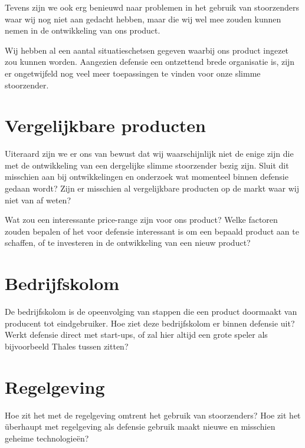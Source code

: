 \documentclass[oneside, a4paper, openany]{memoir}
\begin{document}
Tevens zijn we ook erg benieuwd naar problemen in het gebruik van stoorzenders waar wij nog niet aan gedacht hebben, maar die wij wel mee zouden kunnen nemen in de ontwikkeling van ons product.

Wij hebben al een aantal situatieschetsen gegeven waarbij ons product ingezet zou kunnen worden. Aangezien defensie een ontzettend brede organisatie is, zijn er ongetwijfeld nog veel meer toepassingen te vinden voor onze slimme stoorzender.

\section{Vergelijkbare producten}
Uiteraard zijn we er ons van bewust dat wij waarschijnlijk niet de enige zijn die met de ontwikkeling van een dergelijke slimme stoorzender bezig zijn. Sluit dit misschien aan bij ontwikkelingen en onderzoek wat momenteel binnen defensie gedaan wordt? Zijn er misschien al vergelijkbare producten op de markt waar wij niet van af weten?

Wat zou een interessante price-range zijn voor ons product? Welke factoren zouden bepalen of het voor defensie interessant is om een bepaald product aan te schaffen, of te investeren in de ontwikkeling van een nieuw product?

\section{Bedrijfskolom}
De bedrijfskolom is de opeenvolging van stappen die een product doormaakt van producent tot eindgebruiker. Hoe ziet deze bedrijfskolom er binnen defensie uit? Werkt defensie direct met start-ups, of zal hier altijd een grote speler als bijvoorbeeld Thales tussen zitten?

\section{Regelgeving}
Hoe zit het met de regelgeving omtrent het gebruik van stoorzenders? Hoe zit het überhaupt met regelgeving als defensie gebruik maakt nieuwe en misschien geheime technologieën?

\backmatter
\printbibliography


\end{document}
